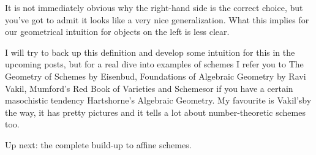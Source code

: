 It is not immediately obvious why the right-hand side is the correct choice, but you've got to admit it looks like a very nice generalization. What this implies for our geometrical intuition for objects on the left is less clear.

I will try to back up this definition and develop some intuition for this in the upcoming posts, but for a real dive into examples of schemes I refer you to \iftex\cite{geometry-of-schemes}\fi\ifblog The Geometry of Schemes by Eisenbud\fi, \iftex\cite{foag}\fi\ifblog Foundations of Algebraic Geometry by Ravi Vakil\fi, \iftex\cite{red-book}\fi\ifblog Mumford's Red Book of Varieties and Schemes\fi or if you have a certain masochistic tendency \iftex\cite{hartshorne}\fi\ifblog Hartshorne's Algebraic Geometry\fi. My favourite is \iftex\cite{foag}\fi\ifblog Vakil's\fi by the way, it has pretty pictures and it tells a lot about number-theoretic schemes too.

Up next: the complete build-up to affine schemes.
